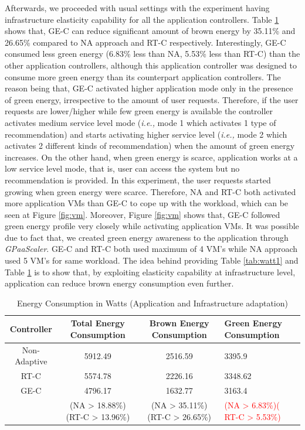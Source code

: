 Afterwards, we proceeded with usual settings with the experiment having infrastructure elasticity capability for all the application controllers. Table \ref{tab:watt2} shows that, GE-C can reduce significant amount of brown energy by 35.11\% and 26.65\% compared to NA approach and RT-C respectively. Interestingly, GE-C consumed less green energy (6.83\% less than NA, 5.53\% less than RT-C) than the other application controllers, although this application controller was designed to consume more green energy than its counterpart application controllers. The reason being that, GE-C activated higher application mode only in the presence of green energy, irrespective to the amount of user requests. Therefore, if the user requests are lower/higher while few green energy is available the controller activates medium service level mode
 (\emph{i.e.,} mode 1 which activates 1 type of recommendation) and starts activating higher service level (\emph{i.e.,} mode 2 which activates 2 different kinds of recommendation) when the amount of green energy increases. On the other hand, when green energy is scarce, application works at a low service level mode, that is, user can access the system but no recommendation is provided. In this experiment, the user requests started growing when green energy were scarce. Therefore, NA and RT-C both activated more application VMs than GE-C to cope up with the workload, which can be seen at Figure \ref{fig:vm}. Moreover, Figure \ref{fig:vm} shows that, GE-C followed green energy profile very closely while activating application VMs. It was possible due to fact that, we created green energy awareness to the application through \emph{GPaaScaler}. GE-C and RT-C both used maximum of 4 VM's while NA approach used 5 VM's for same workload. The idea behind providing Table \ref{tab:watt1} and Table \ref{tab:watt2} is to show that, by exploiting elasticity capability at infrastructure level, application can reduce brown energy consumption even further.



\begin{table}
\caption{Energy Consumption in Watts (Application and Infrastructure adaptation)}
  \label{tab:watt2}
\begin{tabular}{cccl}
\toprule
Controller & Total Energy Consumption & Brown Energy Consumption & Green Energy Consumption\\
\midrule
Non-Adaptive & 5912.49 & 2516.59 & 3395.9 \\
RT-C & 5574.78 & 2226.16 & 3348.62  \\  %
GE-C & 4796.17 & 1632.77  & 3163.4  \\
   & (NA > 18.88\%)(RT-C > 13.96\%) & (NA > 35.11\%) (RT-C > 26.65\%) & \textcolor{red}{(NA > 6.83\%)( RT-C > 5.53\%)} \\
\bottomrule
\end{tabular}
\end{table}

